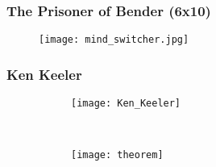 \documentclass{beamer}
\begin{document}
\begin{frame}
  \frametitle{The Prisoner of Bender (6x10)}


  \begin{figure}[h]
    \centering
    \texttt{[image: mind\_switcher.jpg]}
  \end{figure}
 \end{frame}

 \begin{frame}
 \frametitle{Ken Keeler}

\begin{figure}
        \centering
        \begin{subfigure}[b]{0.3\textwidth}
                \texttt{[image: Ken\_Keeler]}
                \label{fig:gull}
        \end{subfigure}%
        ~ %
        \begin{subfigure}[b]{0.54\textwidth}
                \texttt{[image: theorem]}
                \label{fig:tiger}
        \end{subfigure}
 \end{figure}

  
 \end{frame}
\end{document}
